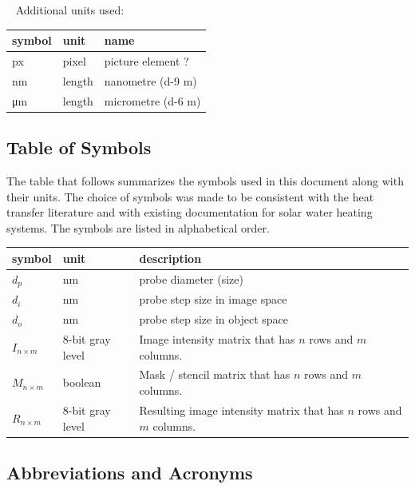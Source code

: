 \documentclass[12pt]{article}
\begin{document}
~\newline
Additional units used:
~\newline

  \noindent \begin{tabular}{l l l} 
    \toprule		
    \textbf{symbol} & \textbf{unit} & \textbf{name}\\
    \midrule
    px & pixel & picture element ?\\
    \si{\nm} & length & nanometre (\num{d-9} m)\\
    \si{\um} & length & micrometre (\num{d-6} m)\\
    \bottomrule
  \end{tabular}

\subsection{Table of Symbols}

The table that follows summarizes the symbols used in this document along with
their units.  The choice of symbols was made to be consistent with the heat
transfer literature and with existing documentation for solar water heating
systems.  The symbols are listed in alphabetical order.

\renewcommand{\arraystretch}{1.2}
\noindent \begin{longtable*}{l l p{12cm}} \toprule
\textbf{symbol} & \textbf{unit} & \textbf{description}\\
\midrule 
$d_p$ & \si[per-mode=symbol] {\nm} & probe diameter (size)\\
$d_i$ & \si[per-mode=symbol] {\nm} & probe step size in image space\\
$d_o$ & \si[per-mode=symbol] {\nm} & probe step size in object space\\
$I_{n\times m}$ & 8-bit gray level & Image intensity matrix that has $n$ rows and $m$ columns.\\
$M_{n\times m}$ & boolean & Mask / stencil matrix that has $n$ rows and $m$ columns.\\
$R_{n\times m}$ & 8-bit gray level & Resulting image intensity matrix that has $n$ rows and $m$ columns.\\
\bottomrule
\end{longtable*}

\subsection{Abbreviations and Acronyms}
\end{document}
